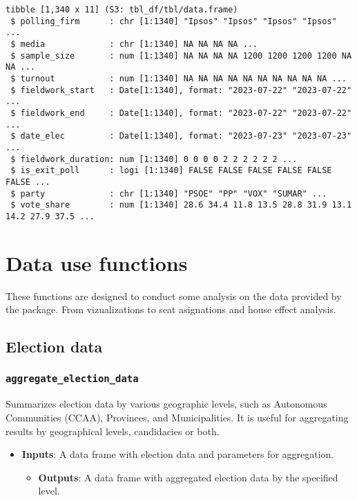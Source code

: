 \documentclass[
  letterpaper,
  DIV=11,
  numbers=noendperiod]{scrreprt}
\providecommand{\tightlist}{%
  \setlength{\itemsep}{0pt}\setlength{\parskip}{0pt}}\usepackage{longtable,booktabs,array}
\begin{document}
\begin{verbatim}
tibble [1,340 x 11] (S3: tbl_df/tbl/data.frame)
 $ polling_firm      : chr [1:1340] "Ipsos" "Ipsos" "Ipsos" "Ipsos" ...
 $ media             : chr [1:1340] NA NA NA NA ...
 $ sample_size       : num [1:1340] NA NA NA NA 1200 1200 1200 1200 NA NA ...
 $ turnout           : num [1:1340] NA NA NA NA NA NA NA NA NA NA ...
 $ fieldwork_start   : Date[1:1340], format: "2023-07-22" "2023-07-22" ...
 $ fieldwork_end     : Date[1:1340], format: "2023-07-22" "2023-07-22" ...
 $ date_elec         : Date[1:1340], format: "2023-07-23" "2023-07-23" ...
 $ fieldwork_duration: num [1:1340] 0 0 0 0 2 2 2 2 2 2 ...
 $ is_exit_poll      : logi [1:1340] FALSE FALSE FALSE FALSE FALSE FALSE ...
 $ party             : chr [1:1340] "PSOE" "PP" "VOX" "SUMAR" ...
 $ vote_share        : num [1:1340] 28.6 34.4 11.8 13.5 28.8 31.9 13.1 14.2 27.9 37.5 ...
\end{verbatim}

\hypertarget{data-use-functions}{%
\section{Data use functions}\label{data-use-functions}}

These functions are designed to conduct some analysis on the data
provided by the package. From vizualizations to seat asignations and
house effect analysis.

\hypertarget{election-data-1}{%
\subsection{Election data}\label{election-data-1}}

\hypertarget{aggregate_election_data}{%
\subsubsection{\texorpdfstring{\texttt{aggregate\_election\_data}}{aggregate\_election\_data}}\label{aggregate_election_data}}

Summarizes election data by various geographic levels, such as
Autonomous Communities (CCAA), Provinces, and Municipalities. It is
useful for aggregating results by geographical levels, candidacies or
both.

\begin{itemize}
\tightlist
\item
  \textbf{Inputs}: A data frame with election data and parameters for
  aggregation.

  \begin{itemize}
  \tightlist
  \item
    \textbf{Outputs}: A data frame with aggregated election data by the
    specified level.
  \end{itemize}
\end{itemize}
\end{document}
